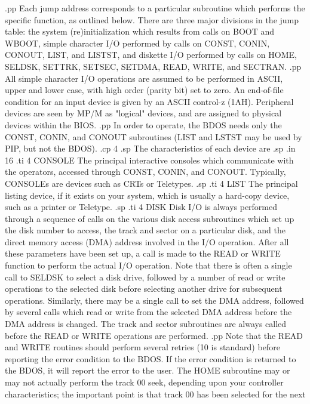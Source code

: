.pp
Each jump address corresponds to a particular subroutine which performs
the specific function, as outlined below.  There are three major
divisions in the jump table:  the system (re)initialization which
results from calls on BOOT and WBOOT, simple character I/O performed by
calls on CONST, CONIN, CONOUT, LIST, and LISTST, and diskette
I/O performed by calls on HOME, SELDSK, SETTRK, SETSEC, SETDMA, READ,
WRITE, and SECTRAN.
.pp
All simple character I/O operations are assumed to be performed in
ASCII, upper and lower case, with high order (parity bit) set to zero.
An end-of-file condition for an input device is given by an ASCII
control-z (1AH).  Peripheral devices are seen by MP/M as "logical"
devices, and are assigned to physical devices within the BIOS.
.pp
In order to operate, the BDOS needs only the CONST, CONIN, and CONOUT
subroutines (LIST and LSTST may be used by PIP, but not the
BDOS).
.cp 4
.sp
The characteristics of each device are
.sp
.in 16
.ti 4
CONSOLE    The principal interactive consoles which communicate with
the operators, accessed through CONST, CONIN, and CONOUT. Typically,
CONSOLEs are devices such as CRTs or Teletypes.
.sp
.ti 4
LIST       The principal listing device, if it exists on your system,
which is usually a hard-copy device, such as a printer or Teletype.
.sp
.ti 4
DISK       Disk I/O is always performed through a sequence of calls on the various
disk access subroutines which set up the disk number to access, the
track and sector on a particular disk, and the direct memory access
(DMA) address involved in the I/O operation.  After all these
parameters have been set up, a call is made to the READ or WRITE
function to perform the actual I/O operation.  Note that there is often
a single call to SELDSK to select a disk drive, followed by a number of
read or write operations to the selected disk before selecting another
drive for subsequent operations.  Similarly, there may be a single call
to set the DMA address, followed by several calls which read or write
from the selected DMA address before the DMA address is changed.  The
track and sector subroutines are always called before the READ or WRITE
operations are performed.
.pp
Note that the READ and WRITE routines should perform several retries
(10 is standard) before reporting the error condition to the BDOS.  If
the error condition is returned to the BDOS, it will report the error
to the user.  The HOME subroutine may or may not actually perform the
track 00 seek, depending upon your controller characteristics; the
important point is that track 00 has been selected for the next
